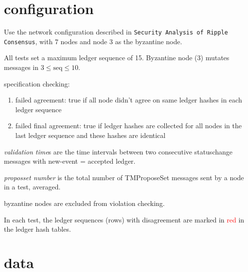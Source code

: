 \documentclass[11pt]{article}
\begin{document}
\section{configuration}

Use the network configuration described in \texttt{Security Analysis of Ripple Consensus}, with 7 nodes and node 3 as the byzantine node.

All tests set a maximum ledger sequence of 15. Byzantine node (3) mutates messages in $3 \leq \text{seq} \leq 10$.

specification checking:
\begin{enumerate}
    \item failed agreement: true if all node didn't agree on same ledger hashes in each ledger sequence
    \item failed final agreement: true if ledger hashes are collected for all nodes in the last ledger sequence and these hashes are identical
\end{enumerate}

\textit{validation time}s are the time intervals between two consecutive statuschange messages with new-event = accepted ledger. 

\textit{proposset number} is the total number of TMProposeSet messages sent by a node in a test, averaged.

byzantine nodes are excluded from violation checking.

In each test, the ledger sequences (rows) with disagreement are marked in \textcolor{red}{red} in the ledger hash tables.


\section{data}
\FloatBarrier


% 

\end{document}
